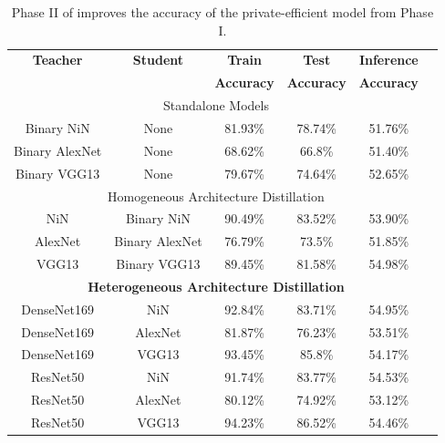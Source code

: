 \begin{table}[!htb]
\begin{center}
\renewcommand\arraystretch{1.5}
\fontsize{6.5pt}{6.5pt}\selectfont
\begin{tabular}{|c|c|c|c|c|c|}
\hline
\textbf{Teacher} & \textbf{Student} & \textbf{Train}  & \textbf{Test}  & \textbf{Inference}  \\
&  & \textbf{Accuracy} & \textbf{Accuracy} & \textbf{Accuracy}  \\
\hline
\multicolumn{5}{|c|}{Standalone Models}\\
\hline
Binary NiN & None & 81.93\% & 78.74\% & 51.76\% \\
Binary AlexNet & None & 68.62\% & 66.8\% & 51.40\% \\
Binary VGG13 & None & 79.67\% & 74.64\% & 52.65\%\\
\hline
\multicolumn{5}{|c|}{Homogeneous Architecture Distillation}\\
\hline
NiN & Binary NiN & 90.49\% & 83.52\% & 53.90\% \\
AlexNet & Binary AlexNet & 76.79\% & 73.5\% & 51.85\% \\
VGG13 & Binary VGG13 & 89.45\% & 81.58\% & 54.98\%\\
\hline
\multicolumn{5}{|c|}{\textbf{Heterogeneous Architecture Distillation}}\\
\hline
DenseNet169 & NiN & 92.84\% & 83.71\% & 54.95\%\\
DenseNet169 & AlexNet & 81.87\% & 76.23\% & 53.51\%\\
DenseNet169 & VGG13 & 93.45\% & 85.8\% & 54.17\%\\
\hline
ResNet50 & NiN & 91.74\% & 83.77\% & 54.53\% \\
ResNet50 & AlexNet & 80.12\% & 74.92\% & 53.12\%\\
ResNet50 & VGG13 & 94.23\% & 86.52\% & 54.46\%\\
\hline
\end{tabular}
\end{center}
\caption{Phase II of \method\hspace{0.02in} improves the accuracy of the private-efficient model from Phase I.}
\label{kd}
\vspace{-0.2in}
\end{table}


